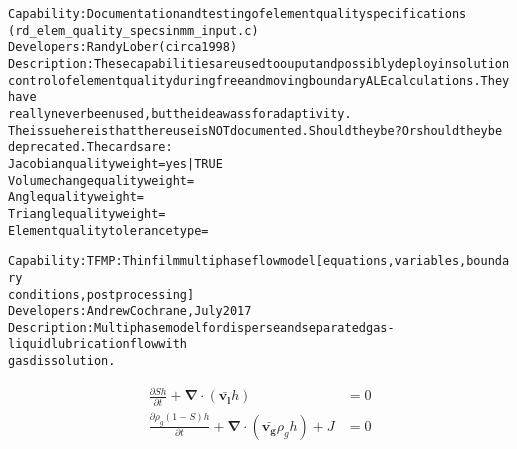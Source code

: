 \documentclass{article}
\begin{document}
\begin{alltt}
Capability: Documentation and testing of element quality specifications
(rd_elem_quality_specs in mm_input.c)
Developers: Randy Lober (circa 1998)
Description: These capabilities are used to ouput and possibly deploy in solution
control of element quality during free and moving boundary ALE calculations.  They have
really never been used, but the idea wass for adaptivity.  
The issue here is that there use is NOT documented.    Should they be?  Or should they be
deprecated.   The cards are:
Jacobian quality weight= yes | TRUE
Volume change quality weight=
Angle quality weight=
Triangle quality weight=
Element quality tolerance type=

Capability: TFMP: Thin film multiphase flow model [equations, variables, boundary
conditions, post processing]
Developers: Andrew Cochrane, July 2017
Description: Multiphase model for disperse and separated gas-liquid lubrication flow with
gas dissolution.
\end{alltt}
\begin{align*}
 \frac{\partial Sh}{\partial t} + \bm{\nabla \cdot} (\bm{\bar{v_l}}h) &= 0 \\
 \frac{\partial \rho_g(1-S)h}{\partial t} + \bm {\nabla} \cdot (\bm{\bar{v_g}}\rho_gh) + J &= 0
\end{align*}
\end{document}
